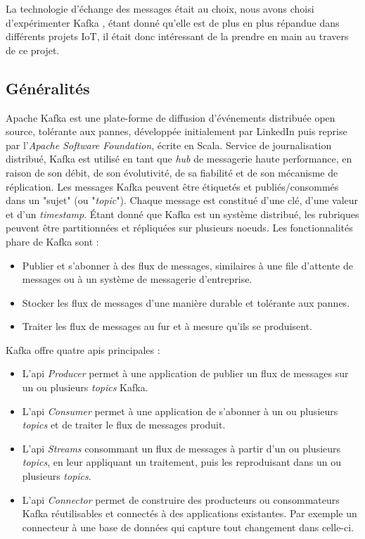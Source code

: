 La technologie d'échange des messages était au choix, nous avons choisi d'expérimenter Kafka \cite{kafka}, étant donné qu'elle est de plus en plus répandue dans différents projets IoT, il était donc intéressant de la prendre en main au travers de ce projet.

\subsection{Généralités}
Apache Kafka est une plate-forme de diffusion d'événements distribuée open source, tolérante aux pannes, développée initialement par LinkedIn puis reprise par l'\textit{Apache Software Foundation}, écrite en Scala. Service de journalisation distribué, Kafka est utilisé en tant que \textit{hub} de messagerie haute performance, en raison de son débit, de son évolutivité, de sa fiabilité et de son mécanisme de réplication. Les messages Kafka peuvent être étiquetés et publiés/consommés dans un "sujet" (ou "\textit{topic}"). Chaque message est constitué d'une clé, d'une valeur et d'un \textit{timestamp}. Étant donné que Kafka est un système distribué, les rubriques peuvent être partitionnées et répliquées sur plusieurs noeuds. Les fonctionnalités phare de Kafka sont :
\begin{itemize}
    \item Publier et s'abonner à des flux de messages, similaires à une file d'attente de messages ou à un système de messagerie d'entreprise.
    \item Stocker les flux de messages d'une manière durable et tolérante aux pannes.
    \item Traiter les flux de messages au fur et à mesure qu'ils se produisent.
\end{itemize}

Kafka offre quatre \acrshort{api}s principales :
\begin{itemize}
    \item L'\acrshort{api} \textit{Producer} permet à une application de publier un flux de messages sur un ou plusieurs \textit{topics} Kafka.
    \item L'\acrshort{api} \textit{Consumer} permet à une application de s'abonner à un ou plusieurs \textit{topics} et de traiter le flux de messages produit.
    \item L'\acrshort{api} \textit{Streams} consommant un flux de messages à partir d'un ou plusieurs \textit{topics}, en leur appliquant un traitement, puis les reproduisant dans un ou plusieurs \textit{topics}.
    \item L'\acrshort{api} \textit{Connector} permet de construire des producteurs ou consommateurs Kafka réutilisables et connectés à des applications existantes. Par exemple un connecteur à une base de données qui capture tout changement dans celle-ci.
\end{itemize}

